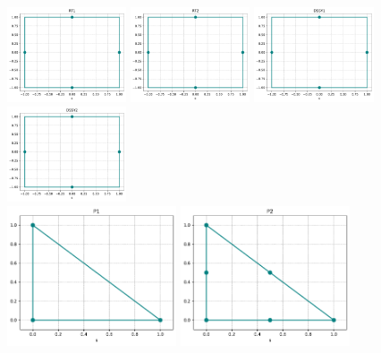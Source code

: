 \begin{center}
\includegraphics[width=3.53cm]{python_codes/fieldstone_120/spaces/RT1_nodes}
\includegraphics[width=3.53cm]{python_codes/fieldstone_120/spaces/RT2_nodes}
\includegraphics[width=3.53cm]{python_codes/fieldstone_120/spaces/DSSY1_nodes}
\includegraphics[width=3.53cm]{python_codes/fieldstone_120/spaces/DSSY2_nodes}\\
\includegraphics[width=5cm]{python_codes/fieldstone_120/spaces/P1_nodes}
\includegraphics[width=5cm]{python_codes/fieldstone_120/spaces/P2_nodes}

\end{center}

